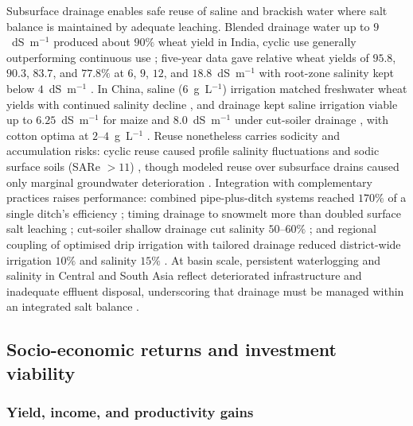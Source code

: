 Subsurface drainage enables safe reuse of saline and brackish water where salt
balance is maintained by adequate leaching. Blended drainage water up to
$9$~dS~m$^{-1}$ produced about $90\%$ wheat yield in India, cyclic use generally
outperforming continuous use \parencite{Sharma2004}; five-year data gave relative
wheat yields of $95.8$, $90.3$, $83.7$, and $77.8\%$ at $6$, $9$, $12$, and
$18.8$~dS~m$^{-1}$ with root-zone salinity kept below $4$~dS~m$^{-1}$
\parencite{Sharma1998}. In China, saline ($6$~g~L$^{-1}$)
irrigation matched freshwater wheat yields with continued salinity decline
\parencite{Gao2023}, and drainage kept saline irrigation viable up to
$6.25$~dS~m$^{-1}$ for maize \parencite{Feng2017} and $8.0$~dS~m$^{-1}$
under cut-soiler drainage \parencite{Neha2022}, with cotton optima at
$2$--$4$~g~L$^{-1}$ \parencite{Li2024,Lu2019}. Reuse nonetheless carries sodicity
and accumulation risks: cyclic reuse caused profile salinity fluctuations and
sodic surface soils (SARe $>11$) \parencite{Mitchell2000,Jayawardane2001},
though modeled reuse over subsurface drains caused only marginal groundwater
deterioration \parencite{KARAJEH1994c}. Integration with complementary practices
raises performance: combined pipe-plus-ditch systems reached $170\%$ of a single
ditch's efficiency \parencite{Yao2024}; timing drainage to snowmelt more than
doubled surface salt leaching \parencite{Yu2016}; cut-soiler shallow drainage cut
salinity $50$--$60\%$ \parencite{Neha2022,Neha2022b}; and regional coupling of
optimised drip irrigation with tailored drainage reduced district-wide irrigation
$10\%$ and salinity $15\%$ \parencite{Liu2026}. At basin scale, persistent
waterlogging and salinity in Central and South Asia reflect deteriorated
infrastructure and inadequate effluent disposal, underscoring that drainage must
be managed within an integrated salt balance
\parencite{Dukhovny2007,Qureshi2008,Ritzema2016}.

\subsection{Socio-economic returns and investment viability}

\subsubsection{Yield, income, and productivity gains}

